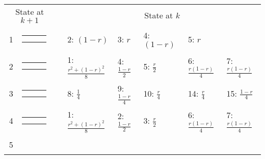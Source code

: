 \begin{center}
\begin{tabular}{ccclllll} \hline
\multicolumn{2}{c}{State at $k+1$} & &
\multicolumn{5}{c}{State at $k$} \\
\cline{1-2} \cline{4-8}
1 &
{\renewcommand{\arraystretch}{0.3}
\renewcommand{\tabcolsep}{0.5mm}
\parbox[b][3mm][c]{12mm}{
\begin{tabular}{|p{2mm}|p{2mm}||p{2mm}|} \hline
$\bullet$ & $\bullet$ &           \\
$\bullet$ & $\circ  $ &           \\ \hline
\end{tabular}}}
&
& 2: $(1-r)$
& 3: $r$
& 4: $(1-r)$
& 5: $r$
& \\
2 &
{\renewcommand{\arraystretch}{0.3}
\renewcommand{\tabcolsep}{0.5mm}
\parbox[b][3mm][c]{12mm}{
\begin{tabular}{|p{2mm}|p{2mm}||p{2mm}|} \hline
$\bullet$ &           & $\bullet$ \\
$\bullet$ &           & $\circ  $ \\ \hline
\end{tabular}}}
&
& 1: $\frac{r^2+(1-r)^2}{8}$
& 4: $\frac{1-r}{2}$
& 5: $\frac{r}{2}$
& 6: $\frac{r(1-r)}{4}$
& 7: $\frac{r(1-r)}{4}$
\\
3 &
{\renewcommand{\arraystretch}{0.3}
\renewcommand{\tabcolsep}{0.5mm}
\parbox[b][3mm][c]{12mm}{
\begin{tabular}{|p{2mm}|p{2mm}||p{2mm}|} \hline
$\bullet$ &           & $\bullet$ \\
          & $\bullet$ & $\circ  $ \\ \hline
\end{tabular}}}
&
& 8: $\frac{1}{4}$
& 9: $\frac{1-r}{4}$
& 10: $\frac{r}{4}$
& 14: $\frac{r}{4}$
& 15: $\frac{1-r}{4}$
\\
4 &
{\renewcommand{\arraystretch}{0.3}
\renewcommand{\tabcolsep}{0.5mm}
\parbox[b][3mm][c]{12mm}{
\begin{tabular}{|p{2mm}|p{2mm}||p{2mm}|} \hline
$\bullet$ &           & $\bullet$ \\
$\circ  $ &           & $\bullet$ \\ \hline
\end{tabular}}}
&
& 1: $\frac{r^2+(1-r)^2}{8}$
& 2: $\frac{1-r}{2}$
& 3: $\frac{r}{2}$
& 6: $\frac{r(1-r)}{4}$
& 7: $\frac{r(1-r)}{4}$
\\
5 &
{\renewcommand{\arraystretch}{0.3}
\renewcommand{\tabcolsep}{0.5mm}
\parbox[b][3mm][c]{12mm}{
\begin{tabular}{|p{2mm}|p{2mm}||p{2mm}|} \hline

\end{tabular}}}
\end{tabular}
\end{center}
